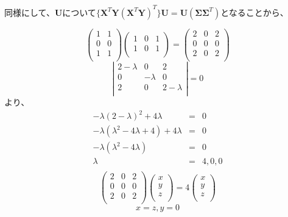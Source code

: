 \begin{enumerate}
同様にして、\({\mathbf U}\)について\(\{{\mathbf X}^T{\mathbf Y}({\mathbf X}^T{\mathbf Y})^T\}{\mathbf U} = {\mathbf U}({\mathbf \Sigma}{\mathbf \Sigma}^T)\)となることから、

\[
\left(
\begin{array}{rr}
1 & 1\\
0 & 0\\
1 & 1\\
\end{array}
\right)
\left(
\begin{array}{rrr}
1 & 0 & 1\\
1 & 0 & 1\\
\end{array}
\right)
= 
\left(
\begin{array}{rrr}
2 & 0 & 2\\
0 & 0 & 0\\
2 & 0 & 2\\
\end{array}
\right)
\]
\[
\left|
\begin{array}{ccc}
2 - \lambda &         0 & 2 \\
0           & - \lambda & 0 \\
2           &         0 & 2 - \lambda \\
\end{array}
\right|
= 0
\]
より、
\begin{eqnarray*}
- \lambda (2-\lambda)^2 + 4 \lambda & = & 0 \\
- \lambda (\lambda^2 -4 \lambda + 4) + 4 \lambda & = & 0 \\
- \lambda (\lambda^2 -4 \lambda ) & = & 0 \\
\lambda & = & 4, 0, 0 \\
\end{eqnarray*}
\[
\left(
\begin{array}{ccc}
2 & 0 & 2 \\
0 & 0 & 0 \\
2 & 0 & 2 \\
\end{array}
\right)
\left(
\begin{array}{c}
x\\
y\\
z\\
\end{array}
\right)
= 4
\left(
\begin{array}{c}
x\\
y\\
z\\
\end{array}
\right)
\]
\[x = z , y = 0\]


\end{enumerate}
